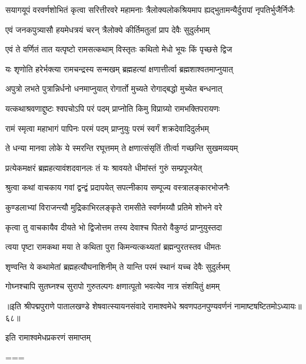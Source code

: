 \twolineshloka
{सयागयूपं वरवर्णशोभितं कृत्वा सरित्तीरवरे महामनाः}
{त्रैलोक्यलोकश्रियमाप ह्यद्भुतामन्यैर्दुरापां नृपतिर्भुजैर्निजैः}%

\twolineshloka
{एवं जनकपुत्र्यासौ हयमेधत्रयं चरन्}
{त्रैलोक्ये कीर्तिमतुलां प्राप देवैः सुदुर्लभाम्}%

\twolineshloka
{एवं ते वर्णितं तात यत्पृष्टो रामसत्कथाम्}
{विस्तृतः कथितो मेधो भूयः किं पृच्छसे द्विज}%

\twolineshloka
{यः शृणोति हरेर्भक्त्या रामचन्द्रस्य सन्मखम्}
{ब्रह्महत्यां क्षणात्तीर्त्वा ब्रह्मशाश्वतमाप्नुयात्}%

\twolineshloka
{अपुत्रो लभते पुत्रान्निर्धनो धनमाप्नुयात्}
{रोगार्तो मुच्यते रोगाद्बद्धो मुच्येत बन्धनात्}%

\twolineshloka
{यत्कथाश्रवणाद्दुष्टः श्वपचोऽपि परं पदम्}
{प्राप्नोति किमु विप्राग्र्यो रामभक्तिपरायणः}%

\twolineshloka
{रामं स्मृत्वा महाभागं पापिनः परमं पदम्}
{प्राप्नुयुः परमं स्वर्गं शक्रदेवादिदुर्लभम्}%

\twolineshloka
{ते धन्या मानवा लोके ये स्मरन्ति रघूत्तमम्}
{ते क्षणात्संसृतिं तीर्त्वा गच्छन्ति सुखमव्ययम्}%

\twolineshloka
{प्रत्येकमक्षरं ब्रह्महत्यावंशदवानलः}
{तं यः श्रावयते धीमांस्तं गुरुं सम्प्रपूजयेत्}%

\twolineshloka
{श्रुत्वा कथां वाचकाय गवां द्वन्द्वं प्रदापयेत्}
{सपत्नीकाय सम्पूज्य वस्त्रालङ्कारभोजनैः}%

\twolineshloka
{कुण्डलाभ्यां विराजन्त्यौ मुद्रिकाभिरलङ्कृते}
{रामसीते स्वर्णमय्यौ प्रतिमे शोभने वरे}%

\twolineshloka
{कृत्वा तु वाचकायैव दीयते भो द्विजोत्तम}
{तस्य देवाश्च पितरो वैकुण्ठं प्राप्नुयुस्तदा}%

\twolineshloka
{त्वया पृष्टा रामकथा मया ते कथिता पुरा}
{किमन्यत्कथ्यतां ब्रह्मन्पुरतस्तव धीमतः}%

\twolineshloka
{शृण्वन्ति ये कथामेतां ब्रह्महत्यौघनाशिनीम्}
{ते यान्ति परमं स्थानं यच्च देवैः सुदुर्लभम्}%

\twolineshloka
{गोघ्नश्चापि सुतघ्नश्च सुरापो गुरुतल्पगः}
{क्षणात्पूतो भवत्येव नात्र संशयितुं क्षमम्}%

॥इति श्रीपद्मपुराणे पातालखण्डे शेषवात्स्यायनसंवादे रामाश्वमेधे श्रवणपठनपुण्यवर्णनं नामाष्टषष्टितमोऽध्यायः॥६८॥

इति रामाश्वमेधप्रकरणं समाप्तम्

===



